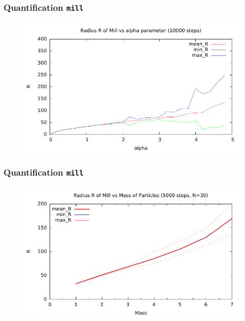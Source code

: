 \documentclass[compress]{beamer}
\begin{document}
\begin{frame}
	\frametitle{Quantification \texttt{mill}}
	\begin{figure}[H]
		\includegraphics[width=1. \columnwidth]{../plots/mill_II_radius_alpha_10000.pdf}
	\end{figure}
\end{frame}

\begin{frame}
	\frametitle{Quantification \texttt{mill}}
	\begin{figure}[H]
		\includegraphics[width=1. \columnwidth]{../plots/mill_II_radius_mass.pdf}
	\end{figure}
\end{frame}
\end{document}
